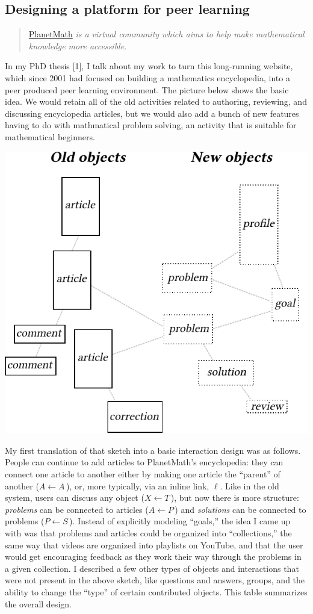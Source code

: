 \subsection{Designing a platform for peer learning\emph{}}

\begin{quote}
\href{planetmath.org}{PlanetMath} \emph{is a virtual community which aims
to help make mathematical knowledge more accessible}.
\end{quote}
In my PhD thesis {[}1{]}, I talk about my work to turn this long-running
website, which since 2001 had focused on building a mathematics
encyclopedia, into a peer produced peer learning environment. The
picture below shows the basic idea. We would retain all of the old
activities related to authoring, reviewing, and discussing encyclopedia
articles, but we would also add a bunch of new features having to do
with mathmatical problem solving, an activity that is suitable for
mathematical beginners.

\begin{center}
\includegraphics[width=.65\textwidth]{../pictures/extension-to-develop.pdf}
\end{center}

My first translation of that sketch into a basic interaction design was
as follows. People can continue to add articles to PlanetMath's
encyclopedia: they can connect one article to another either by making
one article the ``parent'' of another ($A \leftarrow A\,$), or, more typically, via an inline link, $\ell$.  Like in the old system,
users can discuss any object ($X  \leftarrow T\,$),
but now there is more structure: \emph{problems} can be connected to
articles ($A \leftarrow P\,$) and \emph{solutions} can be connected to problems
($P\leftarrow S\,$). Instead of explicitly modeling ``goals,'' the idea I came up with
was that problems and articles could be organized into ``collections,''
the same way that videos are organized into playlists on YouTube, and
that the user would get encouraging feedback as they work their way
through the problems in a given collection. I described a few other
types of objects and interactions that were not present in the above
sketch, like questions and answers, groups, and the ability to change
the ``type'' of certain contributed objects. This table summarizes the
overall design.

